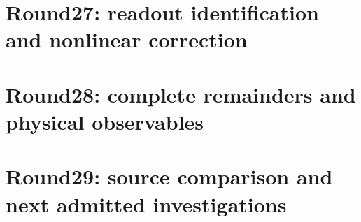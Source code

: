 \documentclass[11pt,a4paper]{article}
\theoremstyle{definition}\newtheorem{definition}[theorem]{Definition}
\theoremstyle{remark}\newtheorem{remark}[theorem]{Remark}
\begin{document}



\clearpage\part{Round27: readout identification and nonlinear correction}

\clearpage\part{Round28: complete remainders and physical observables}

\clearpage\part{Round29: source comparison and next admitted investigations}

\clearpage


\clearpage
\appendix





\end{document}
